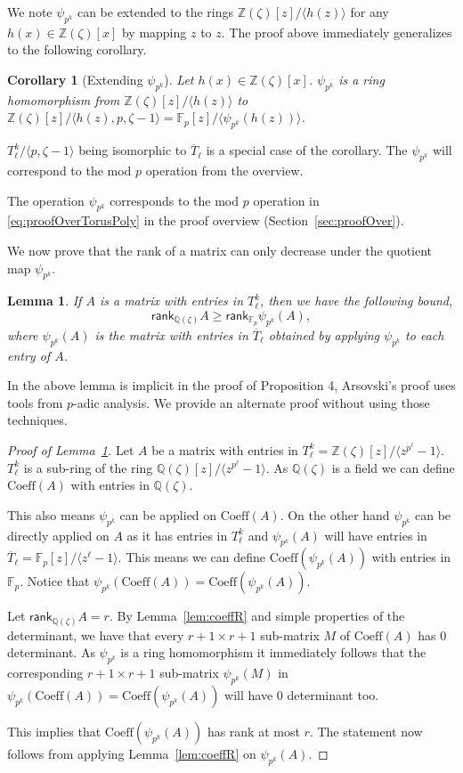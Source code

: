\documentclass[11pt]{article}
\numberwithin{equation}{section}
\newtheorem{lem}[thm]{Lemma}
\newtheorem{cor}[thm]{Corollary}
\def\F{{\mathbb{F}}}
\def\Q{{\mathbb{Q}}}
\def\Z{{\mathbb{Z}}}
\def\rank{\textsf{rank}}
\def\Coeff{\text{Coeff}}
\begin{document}
We note $\psi_{p^k}$ can be extended to the rings $\Z(\zeta)[z]/\langle h(z)\rangle$ for any $h(x)\in \Z(\zeta)[x]$ by mapping $z$ to $z$. The proof above immediately generalizes to the following corollary.

\begin{cor}[Extending $\psi_{p^k}$]\label{cor:psiE}
Let $h(x)\in \Z(\zeta)[x]$. $\psi_{p^k}$ is a ring homomorphism from $\Z(\zeta)[z]/\langle h(z)\rangle$ to $\Z(\zeta)[z]/\langle h(z), p,\zeta-1\rangle=\F_p[z]/\langle \psi_{p^k}(h(z))\rangle$.
\end{cor}
$T_{\ell}^k/\langle p,\zeta-1\rangle$ being isomorphic to $\overline{T}_{\ell}$ is a special case of the corollary. The $\psi_{p^k}$ will correspond to the mod $p$ operation from the overview.

The operation $\psi_{p^k}$ corresponds to the mod $p$ operation in \eqref{eq:proofOverTorusPoly} in the proof overview (Section~\ref{sec:proofOver}).

We now prove that the rank of a matrix can only decrease under the quotient map $\psi_{p^k}$.

\begin{lem}\label{lem:quoRank}
If $A$ is a matrix with entries in $T_{\ell}^k$, then we have the following bound,
{\em$$\rank_{\Q(\zeta)} A  \ge \rank_{\F_p} \psi_{p^k}(A),$$}
where $\psi_{p^k}(A)$ is the matrix with entries in $\overline{T}_{\ell}$ obtained by applying $\psi_{p^k}$ to each entry of $A$.  
\end{lem}
In \cite{arsovski2021padic} the above lemma is implicit in the proof of Proposition 4, Arsovski's proof uses tools from $p$-adic analysis. We provide an alternate proof without using those techniques. 
\begin{proof}[Proof of Lemma~\ref{lem:quoRank}]
Let $A$ be a matrix with entries in $T_{\ell}^k=\Z(\zeta)[z]/\langle z^{p^\ell}-1\rangle$. $T^k_\ell$ is a sub-ring of the ring $\Q(\zeta)[z]/\langle z^{p^\ell}-1\rangle$. As $\Q(\zeta)$ is a field we can define $\Coeff(A)$ with entries in $\Q(\zeta)$. 

This also means $\psi_{p^k}$ can be applied on $\Coeff(A)$. On the other hand $\psi_{p^k}$ can be directly applied on $A$ as it has entries in $T_\ell^k$ and $\psi_{p^k}(A)$ will have entries in $\overline{T}_\ell = \F_p[z]/\langle z^\ell -1 \rangle$. This means we can define $\Coeff(\psi_{p^k}(A))$ with entries in $\F_p$. Notice that $\psi_{p^k}(\Coeff(A))=\Coeff(\psi_{p^k}(A))$.

Let $\rank_{\Q(\zeta)} A=r$. By Lemma~\ref{lem:coeffR} and simple properties of the determinant, we have that every $r+1\times r+1$ sub-matrix $M$ of $\Coeff(A)$ has $0$ determinant. As $\psi_{p^k}$ is a ring homomorphism it immediately follows that the corresponding $r+1\times r+1$ sub-matrix $\psi_{p^k}(M)$ in $\psi_{p^k}(\Coeff(A))=\Coeff(\psi_{p^k}(A))$ will have $0$ determinant too. 

This implies that $\Coeff(\psi_{p^k}(A))$ has rank at most $r$. The statement now follows from applying Lemma~\ref{lem:coeffR} on $\psi_{p^k}(A)$.  
\end{proof}
\end{document}
